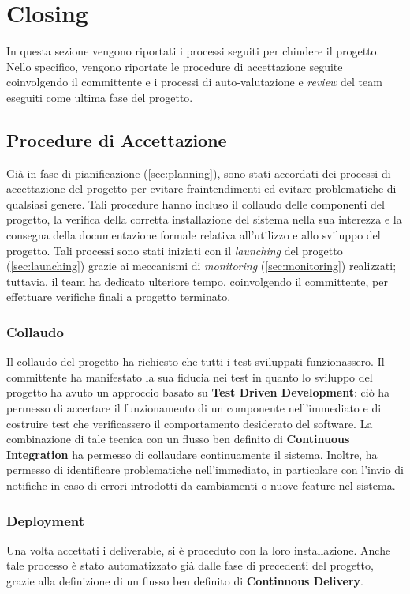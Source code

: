 \section{Closing}
\label{sec:closing}

In questa sezione vengono riportati i processi seguiti per chiudere il progetto. Nello specifico, vengono riportate le procedure di accettazione seguite coinvolgendo il committente e i processi di auto-valutazione e \textit{review} del team eseguiti come ultima fase del progetto.

\subsection{Procedure di Accettazione}
Già in fase di pianificazione (\ref{sec:planning}), sono stati accordati dei processi di accettazione del progetto per evitare fraintendimenti ed evitare problematiche di qualsiasi genere. Tali procedure hanno incluso il collaudo delle componenti del progetto, la verifica della corretta installazione del sistema nella sua interezza e la consegna della documentazione formale relativa all'utilizzo e allo sviluppo del progetto. Tali processi sono stati iniziati con il \textit{launching} del progetto (\ref{sec:launching}) grazie ai meccanismi di \textit{monitoring} (\ref{sec:monitoring}) realizzati; tuttavia, il team ha dedicato ulteriore tempo, coinvolgendo il committente, per effettuare verifiche finali a progetto terminato.

\subsubsection{Collaudo}
Il collaudo del progetto ha richiesto che tutti i test sviluppati funzionassero. Il committente ha manifestato la sua fiducia nei test in quanto lo sviluppo del progetto ha avuto un approccio basato su \textbf{Test Driven Development}: ciò ha permesso di accertare il funzionamento di un componente nell'immediato e di costruire test che verificassero il comportamento desiderato del software. La combinazione di tale tecnica con un flusso ben definito di \textbf{Continuous Integration} ha permesso di collaudare continuamente il sistema. Inoltre, ha permesso di identificare problematiche nell'immediato, in particolare con l'invio di notifiche in caso di errori introdotti da cambiamenti o nuove feature nel sistema.

\subsubsection{Deployment}
Una volta accettati i deliverable, si è proceduto con la loro installazione. Anche tale processo è stato automatizzato già dalle fase di precedenti del progetto, grazie alla definizione di un flusso ben definito di \textbf{Continuous Delivery}.

